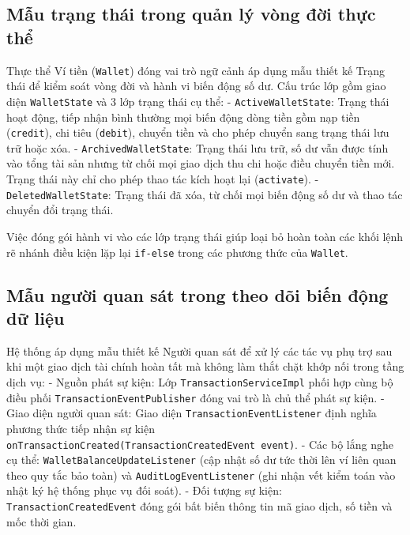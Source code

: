 \documentclass[a4paper,12pt]{report}
\newcommand{\passthrough}[1]{#1}
\begin{document}
\subsection{Mẫu trạng thái trong quản lý vòng đời thực
thể}\label{mux1eabu-trux1ea1ng-thuxe1i-trong-quux1ea3n-luxfd-vuxf2ng-ux111ux1eddi-thux1ef1c-thux1ec3}

Thực thể Ví tiền (\passthrough{\lstinline!Wallet!}) đóng vai trò ngữ
cảnh áp dụng mẫu thiết kế Trạng thái để kiểm soát vòng đời và hành vi
biến động số dư. Cấu trúc lớp gồm giao diện
\passthrough{\lstinline!WalletState!} và 3 lớp trạng thái cụ thể: -
\passthrough{\lstinline!ActiveWalletState!}: Trạng thái hoạt động, tiếp
nhận bình thường mọi biến động dòng tiền gồm nạp tiền
(\passthrough{\lstinline!credit!}), chi tiêu
(\passthrough{\lstinline!debit!}), chuyển tiền và cho phép chuyển sang
trạng thái lưu trữ hoặc xóa. -
\passthrough{\lstinline!ArchivedWalletState!}: Trạng thái lưu trữ, số dư
vẫn được tính vào tổng tài sản nhưng từ chối mọi giao dịch thu chi hoặc
điều chuyển tiền mới. Trạng thái này chỉ cho phép thao tác kích hoạt lại
(\passthrough{\lstinline!activate!}). -
\passthrough{\lstinline!DeletedWalletState!}: Trạng thái đã xóa, từ chối
mọi biến động số dư và thao tác chuyển đổi trạng thái.

Việc đóng gói hành vi vào các lớp trạng thái giúp loại bỏ hoàn toàn các
khối lệnh rẽ nhánh điều kiện lặp lại \passthrough{\lstinline!if-else!}
trong các phương thức của \passthrough{\lstinline!Wallet!}.

\subsection{Mẫu người quan sát trong theo dõi biến động dữ
liệu}\label{mux1eabu-ngux1b0ux1eddi-quan-suxe1t-trong-theo-duxf5i-biux1ebfn-ux111ux1ed9ng-dux1eef-liux1ec7u}

Hệ thống áp dụng mẫu thiết kế Người quan sát để xử lý các tác vụ phụ trợ
sau khi một giao dịch tài chính hoàn tất mà không làm thắt chặt khớp nối
trong tầng dịch vụ: - Nguồn phát sự kiện: Lớp
\passthrough{\lstinline!TransactionServiceImpl!} phối hợp cùng bộ điều
phối \passthrough{\lstinline!TransactionEventPublisher!} đóng vai trò là
chủ thể phát sự kiện. - Giao diện người quan sát: Giao diện
\passthrough{\lstinline!TransactionEventListener!} định nghĩa phương
thức tiếp nhận sự kiện
\passthrough{\lstinline!onTransactionCreated(TransactionCreatedEvent event)!}.
- Các bộ lắng nghe cụ thể:
\passthrough{\lstinline!WalletBalanceUpdateListener!} (cập nhật số dư
tức thời lên ví liên quan theo quy tắc bảo toàn) và
\passthrough{\lstinline!AuditLogEventListener!} (ghi nhận vết kiểm toán
vào nhật ký hệ thống phục vụ đối soát). - Đối tượng sự kiện:
\passthrough{\lstinline!TransactionCreatedEvent!} đóng gói bất biến
thông tin mã giao dịch, số tiền và mốc thời gian.
\end{document}
